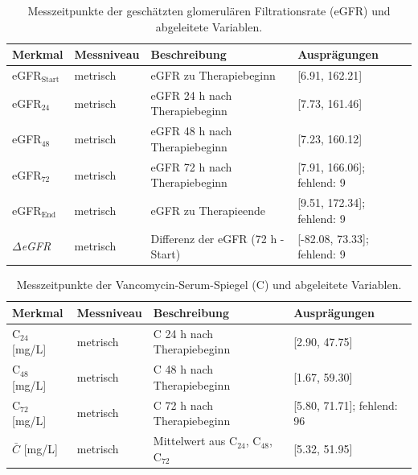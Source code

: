 \documentclass[a4paper,12pt]{article}
\begin{document}
\begin{table}[H]
\small
\centering
\begin{tabular}{p{3.2cm} p{2cm} p{5cm} p{3cm}}
    \toprule
    Merkmal & Messniveau & Beschreibung & Ausprägungen \\\midrule
    eGFR$_{\mathrm{Start}}$ \newline [mL/min/1.73 m$^2$] & metrisch & eGFR zu Therapiebeginn & [6.91, 162.21] \\
    eGFR$_{24}$ \newline [mL/min/1.73 m$^2$] & metrisch & eGFR 24 h nach Therapiebeginn & [7.73, 161.46] \\
    eGFR$_{48}$ \newline [mL/min/1.73 m$^2$] & metrisch & eGFR 48 h nach Therapiebeginn & [7.23, 160.12] \\
    eGFR$_{72}$ \newline [mL/min/1.73 m$^2$] & metrisch & eGFR 72 h nach Therapiebeginn & [7.91, 166.06]; \newline fehlend: 9 \\
    eGFR$_{\mathrm{End}}$ \newline [mL/min/1.73 m$^2$] & metrisch & eGFR zu Therapieende & [9.51, 172.34]; \newline fehlend: 9 \\
    \textit{$\Delta$eGFR} \newline [mL/min/1.73 m$^2$] & metrisch & Differenz der eGFR \newline (72 h - Start) & [-82.08, 73.33]; \newline fehlend: 9\\\bottomrule
\end{tabular}
\caption{\label{tab:eGFR}Messzeitpunkte der geschätzten glomerulären Filtrationsrate (eGFR) und abgeleitete Variablen.}
\end{table}

\begin{table}[H]
\small
\centering
\begin{tabular}{p{3.2cm} p{2cm} p{5cm} p{3cm}}
    \toprule
    Merkmal & Messniveau & Beschreibung & Ausprägungen \\\midrule
    C$_{24}$ [mg/L] & metrisch & C 24 h nach Therapiebeginn & [2.90, 47.75] \\
    C$_{48}$ [mg/L] & metrisch & C 48 h nach Therapiebeginn & [1.67, 59.30] \\
    C$_{72}$ [mg/L] & metrisch & C 72 h nach Therapiebeginn & [5.80, 71.71]; \newline fehlend: 96\\
    $\bar{C}$ [mg/L] & metrisch & Mittelwert aus C$_{24}$, C$_{48}$, C$_{72}$ & [5.32, 51.95] \\\bottomrule
\end{tabular}
\caption{\label{tab:C}Messzeitpunkte der Vancomycin-Serum-Spiegel (C) und abgeleitete Variablen.}
\end{table}
\end{document}
